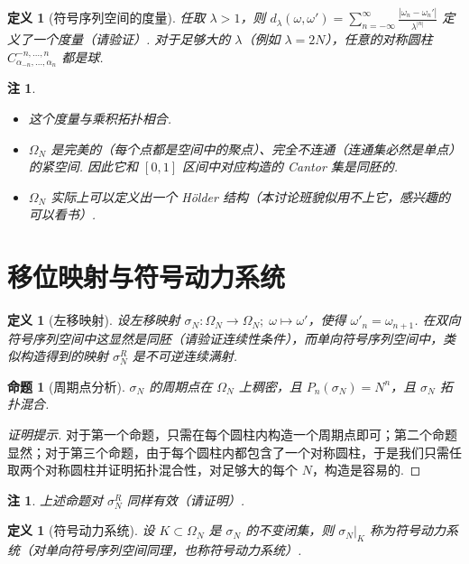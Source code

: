 \documentclass[11pt, a4paper, oneside]{ctexart}
\newtheorem{definition}[theorem]{定义}
\newtheorem{proposition}[theorem]{命题}
\newtheorem{remark}[theorem]{注}
\newcommand{\abs}[1]{\left|{#1}\right|}
\begin{document}
    \begin{definition}[符号序列空间的度量]
        任取 $\lambda>1$，则 $d_{\lambda}(\omega,\omega')=\sum\limits_{n=-\infty}^{\infty}\frac{\abs{\omega_n-\omega_n'}}{\lambda^{\abs{n}}}$ 定义了一个度量（请验证）. 对于足够大的 $\lambda$（例如 $\lambda=2N$），任意的对称圆柱 $C_{\alpha_{-n},\ldots,\alpha_n}^{-n,\ldots,n}$ 都是球.
    \end{definition}
    \begin{remark}
        \begin{itemize}
            \item 这个度量与乘积拓扑相合.
            \item $\Omega_N$ 是完美的（每个点都是空间中的聚点）、完全不连通（连通集必然是单点）的紧空间. 因此它和 $[0,1]$ 区间中对应构造的 Cantor 集是同胚的.
            \item $\Omega_N$ 实际上可以定义出一个 Hölder 结构（本讨论班貌似用不上它，感兴趣的可以看书）.
        \end{itemize}
    \end{remark}

    \section{移位映射与符号动力系统}
    \begin{definition}[左移映射]
        设左移映射 $\sigma_N:\Omega_N\to \Omega_N;\; \omega\mapsto \omega'$，使得 $\omega'_n=\omega_{n+1}$. 在双向符号序列空间中这显然是同胚（请验证连续性条件），而单向符号序列空间中，类似构造得到的映射 $\sigma_N^R$ 是不可逆连续满射.
    \end{definition}

    \begin{proposition}[周期点分析]
        $\sigma_N$ 的周期点在 $\Omega_N$ 上稠密，且 $P_n(\sigma_N)=N^n$，且 $\sigma_N$ 拓扑混合.
    \end{proposition}
    \begin{proof}[证明提示]
        对于第一个命题，只需在每个圆柱内构造一个周期点即可；第二个命题显然；对于第三个命题，由于每个圆柱内都包含了一个对称圆柱，于是我们只需任取两个对称圆柱并证明拓扑混合性，对足够大的每个 $N$，构造是容易的.
    \end{proof}
    \begin{remark}
        上述命题对 $\sigma_N^R$ 同样有效（请证明）.
    \end{remark}

    \begin{definition}[符号动力系统]
        设 $K\subset \Omega_N$ 是 $\sigma_N$ 的不变闭集，则 $\sigma_N|_{K}$ 称为符号动力系统（对单向符号序列空间同理，也称符号动力系统）.
    \end{definition}
\end{document}
